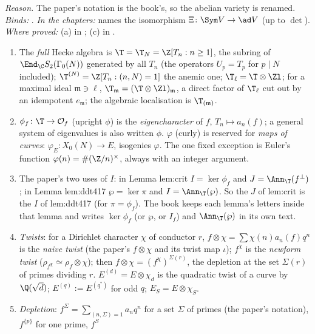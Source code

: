 \noindent\emph{Reason.} The paper's notation is the book's, so the abelian variety is renamed. \emph{Binds:}
. \emph{In the chapters:}
 names the isomorphism $\Xi\colon\Sym V\to\ad V$ (up to $\det$). \emph{Where proved:} (a) in ;
(c) in .

\begin{convention}\label{conv:notation:bc13}
\leavevmode
\begin{enumerate}[label=(\alph*)]
\item The \emph{full} Hecke algebra is $\T=\T_N=\Z[T_n:n\ge1]$, the subring of $\End_\C S_2(\Gamma_0(N))$ generated by all $T_n$ (the operators $U_p=T_p$ for $p\mid N$
included); $\T^{(N)}=\Z[T_n:(n,N)=1]$ the anemic one; $\T_\ell=\T\otimes\Zl$; for a maximal ideal $\mathfrak m\ni\ell$,
$\T_{\mathfrak m}=(\T\otimes\Zl)_{\mathfrak m}$, a direct factor of $\T_\ell$ cut out by an idempotent $e_{\mathfrak m}$; the algebraic localisation
is $\T_{(\mathfrak m)}$.
\item $\phi_f\colon\T\to\mathcal O_f$ (upright $\phi$) is the \emph{eigencharacter} of $f$, $T_n\mapsto a_n(f)$; a general system of
eigenvalues is also written $\phi$. $\varphi$ (curly) is reserved for \emph{maps of curves}: $\varphi_E\colon X_0(N)\to E$, isogenies $\varphi$.
The one fixed exception is Euler's function $\varphi(n)=\#(\Z/n)^\times$, always with an integer argument.
\item The paper's two uses of $I$: in Lemma lem:crit $I=\ker\phi_f$ and $J=\Ann_\T(f^\perp)$; in Lemma lem:ddt417 $\wp=\ker\pi$ and
$I=\Ann_\T(\wp)$. So the $J$ of lem:crit is the $I$ of lem:ddt417 (for $\pi=\phi_f$). The book keeps each lemma's letters inside that
lemma and writes $\ker\phi_f$ (or $\wp$, or $I_f$) and $\Ann_\T(\wp)$ in its own text.
\item \emph{Twists}: for a Dirichlet character $\chi$ of conductor $r$, $f\otimes\chi=\sum\chi(n)a_n(f)q^n$ is the \emph{naive twist} (the
paper's $f\otimes\chi$ and its twist map $\iota$); $f^\chi$ is the \emph{newform twist} ($\rho_{f^\chi}\simeq\rho_f\otimes\chi$); then
$f\otimes\chi=(f^\chi)^{\Sigma(r)}$, the depletion at the set $\Sigma(r)$ of primes dividing $r$. $E^{(d)}=E\otimes\chi_d$ is the quadratic twist
of a curve by $\Q(\sqrt d)$; $E^{(q)}:=E^{(q^*)}$ for odd $q$; $E_S=E\otimes\chi_S$.
\item \emph{Depletion}: $f^\Sigma=\sum_{(n,\Sigma)=1}a_nq^n$ for a set $\Sigma$ of primes (the paper's notation), $f^{\{p\}}$ for one prime, $f^S$

\end{enumerate}
\end{convention}
